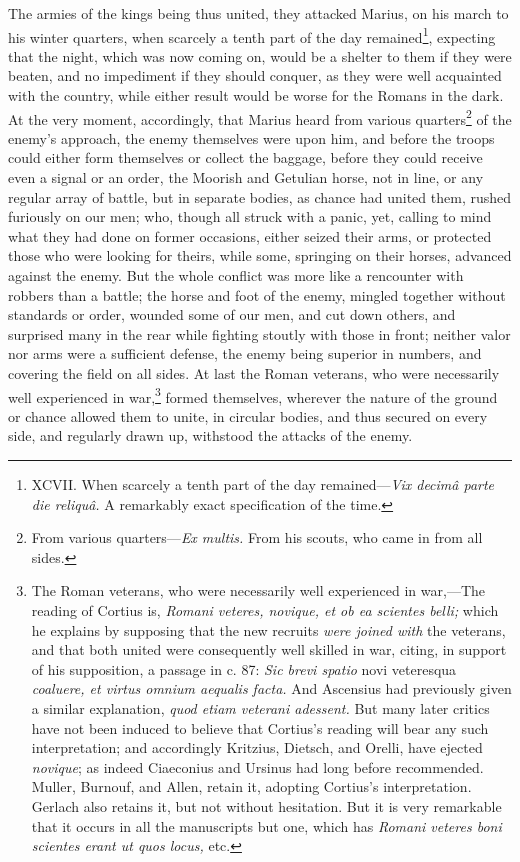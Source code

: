 The armies of the kings being thus united, they attacked Marius, on
his march to his winter quarters, when scarcely a tenth part of the
day remained\footnote{XCVII. When scarcely a tenth part of the day remained—\emph{Vix
decimâ parte die reliquâ.} A remarkably exact specification of the time.}, expecting that the night, which was now coming on,
would be a shelter to them if they were beaten, and no impediment if
they should conquer, as they were well acquainted with the country,
while either result would be worse for the Romans in the dark. At the
very moment, accordingly, that Marius heard from various quarters\footnote{From various quarters—\emph{Ex multis.} From his scouts, who came in
from all sides.}
of the enemy's approach, the enemy themselves were upon him, and
before the troops could either form themselves or collect the baggage,
before they could receive even a signal or an order, the Moorish and
Getulian horse, not in line, or any regular array of battle, but in
separate bodies, as chance had united them, rushed furiously on our
men; who, though all struck with a panic, yet, calling to mind what
they had done on former occasions, either seized their arms, or
protected those who were looking for theirs, while some, springing on
their horses, advanced against the enemy. But the whole conflict was
more like a rencounter with robbers than a battle; the horse and foot
of the enemy, mingled together without standards or order, wounded
some of our men, and cut down others, and surprised many in the rear
while fighting stoutly with those in front; neither valor nor arms
were a sufficient defense, the enemy being superior in numbers, and
covering the field on all sides. At last the Roman veterans, who were
necessarily well experienced in war,\footnote{The Roman veterans, who were necessarily well experienced
in war,—The reading of Cortius is, \emph{Romani veteres, novique, et ob
ea scientes belli;} which he explains by supposing that the new
recruits \emph{were joined with} the veterans, and that both united were
consequently well skilled in war, citing, in support of his
supposition, a passage in c. 87: \emph{Sic brevi spatio} novi veteresqua
\emph{coaluere, et virtus omnium aequalis facta.} And Ascensius had
previously given a similar explanation, \emph{quod etiam veterani
adessent.} But many later critics have not been induced to believe
that Cortius's reading will bear any such interpretation; and
accordingly Kritzius, Dietsch, and Orelli, have ejected \emph{novique}; as
indeed Ciaeconius and Ursinus had long before recommended. Muller,
Burnouf, and Allen, retain it, adopting Cortius's interpretation.
Gerlach also retains it, but not without hesitation. But it is very
remarkable that it occurs in all the manuscripts but one, which has
\emph{Romani veteres boni scientes erant ut quos locus,} etc.} formed themselves, wherever
the nature of the ground or chance allowed them to unite, in circular
bodies, and thus secured on every side, and regularly drawn up,
withstood the attacks of the enemy.

